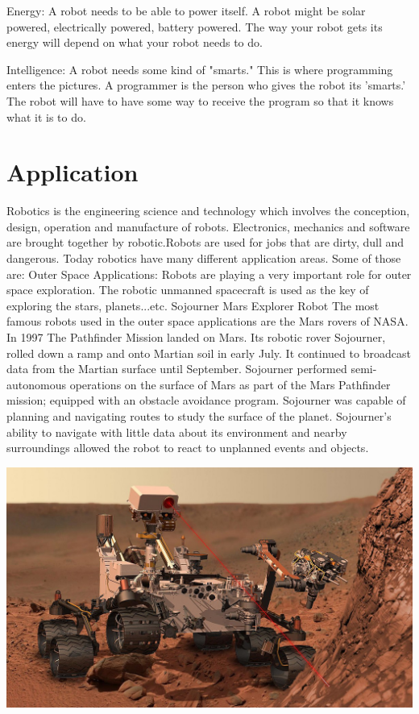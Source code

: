 \documentclass{fisatproject}
\begin{document}
Energy: A robot needs to be able to power itself. A robot might be solar powered, electrically powered, battery powered. The way your robot gets its energy will depend on what your robot needs to do.
\vspace{1cm}

Intelligence: A robot needs some kind of "smarts." This is where programming enters the pictures. A programmer is the person who gives the robot its 'smarts.' The robot will have to have some way to receive the program so that it knows what it is to do.


\section{Application}
Robotics is the engineering science and technology which involves the conception, design, operation and manufacture of robots. Electronics, mechanics and software are brought together by robotic.Robots are used for jobs that are dirty, dull and dangerous. Today robotics have many different application areas. Some of those are:\newline\newline
Outer Space Applications: Robots are playing a very important role for outer space exploration. The robotic unmanned spacecraft is used as the key of exploring the stars, planets...etc.
Sojourner Mars Explorer Robot The most famous robots used in the outer space applications are the Mars rovers of NASA. In 1997 The Pathfinder Mission landed on Mars. Its robotic rover Sojourner, rolled down a ramp and onto Martian soil in early July. It continued to broadcast data from the Martian surface until September.
Sojourner performed semi-autonomous operations on the surface of Mars as part of the Mars Pathfinder mission; equipped with an obstacle avoidance program. Sojourner was capable of planning and navigating routes to study the surface of the planet. Sojourner's ability to navigate with little data about its environment and nearby surroundings allowed the robot to react to unplanned events and objects.\cite{i}

\begin{center}
\includegraphics{mars.png}
\end{center}
\end{document}
